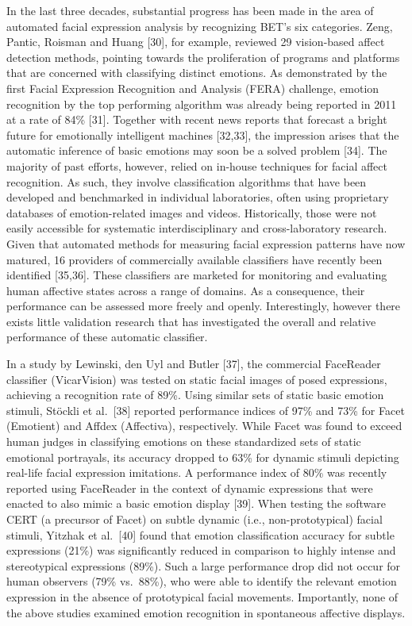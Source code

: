 \documentclass[10pt,letterpaper]{article}
\begin{document}
In the last three decades, substantial progress has been made in the area of automated facial expression analysis by recognizing BET's six categories. Zeng, Pantic, Roisman and Huang {[}30{]}, for example, reviewed 29 vision-based affect detection methods, pointing towards the proliferation of programs and platforms that are concerned with classifying distinct emotions. As demonstrated by the first Facial Expression Recognition and Analysis (FERA) challenge, emotion recognition by the top performing algorithm was already being reported in 2011 at a rate of 84\% {[}31{]}. Together with recent news reports that forecast a bright future for emotionally intelligent machines {[}32,33{]}, the impression arises that the automatic inference of basic emotions may soon be a solved problem {[}34{]}. The majority of past efforts, however, relied on in-house techniques for facial affect recognition. As such, they involve classification algorithms that have been developed and benchmarked in individual laboratories, often using proprietary databases of emotion-related images and videos. Historically, those were not easily accessible for systematic interdisciplinary and cross-laboratory research. Given that automated methods for measuring facial expression patterns have now matured, 16 providers of commercially available classifiers have recently been identified {[}35,36{]}. These classifiers are marketed for monitoring and evaluating human affective states across a range of domains. As a consequence, their performance can be assessed more freely and openly. Interestingly, however there exists little validation research that has investigated the overall and relative performance of these automatic classifier.

In a study by Lewinski, den Uyl and Butler {[}37{]}, the commercial FaceReader classifier (VicarVision) was tested on static facial images of posed expressions, achieving a recognition rate of 89\%. Using similar sets of static basic emotion stimuli, Stöckli et al.~{[}38{]} reported performance indices of 97\% and 73\% for Facet (Emotient) and Affdex (Affectiva), respectively. While Facet was found to exceed human judges in classifying emotions on these standardized sets of static emotional portrayals, its accuracy dropped to 63\% for dynamic stimuli depicting real-life facial expression imitations. A performance index of 80\% was recently reported using FaceReader in the context of dynamic expressions that were enacted to also mimic a basic emotion display {[}39{]}. When testing the software CERT (a precursor of Facet) on subtle dynamic (i.e., non-prototypical) facial stimuli, Yitzhak et al.~{[}40{]} found that emotion classification accuracy for subtle expressions (21\%) was significantly reduced in comparison to highly intense and stereotypical expressions (89\%). Such a large performance drop did not occur for human observers (79\% vs.~88\%), who were able to identify the relevant emotion expression in the absence of prototypical facial movements. Importantly, none of the above studies examined emotion recognition in spontaneous affective displays.
\end{document}

